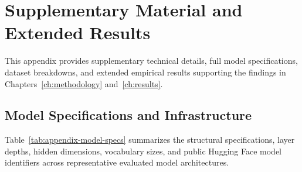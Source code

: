 \chapter{Supplementary Material and Extended Results}
\label{ch:appendix}

This appendix provides supplementary technical details, full model specifications, dataset breakdowns, and extended empirical results supporting the findings in Chapters~\ref{ch:methodology} and~\ref{ch:results}.

\section{Model Specifications and Infrastructure}
\label{sec:appendix-models}

Table~\ref{tab:appendix-model-specs} summarizes the structural specifications, layer depths, hidden dimensions, vocabulary sizes, and public Hugging Face model identifiers across representative evaluated model architectures.

